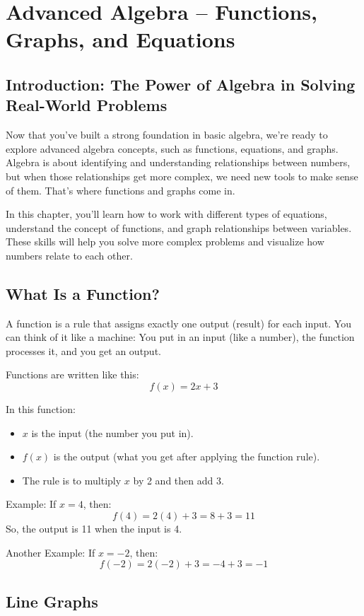 
\chapter{Advanced Algebra – Functions, Graphs, and Equations}

\section{Introduction: The Power of Algebra in Solving Real-World Problems}
Now that you’ve built a strong foundation in basic algebra, we’re ready to explore advanced algebra concepts, such as functions, equations, and graphs. Algebra is about identifying and understanding relationships between numbers, but when those relationships get more complex, we need new tools to make sense of them. That’s where functions and graphs come in.

In this chapter, you’ll learn how to work with different types of equations, understand the concept of functions, and graph relationships between variables. These skills will help you solve more complex problems and visualize how numbers relate to each other.

\section{What Is a Function?}
A function is a rule that assigns exactly one output (result) for each input. You can think of it like a machine: You put in an input (like a number), the function processes it, and you get an output.

Functions are written like this:
\[ f(x) = 2x + 3 \]

In this function:
\begin{itemize}
    \item \( x \) is the input (the number you put in).
    \item \( f(x) \) is the output (what you get after applying the function rule).
    \item The rule is to multiply \( x \) by 2 and then add 3.
\end{itemize}

Example: If \( x = 4 \), then:
\[ f(4) = 2(4) + 3 = 8 + 3 = 11 \]
So, the output is 11 when the input is 4.

Another Example: If \( x = -2 \), then:
\[ f(-2) = 2(-2) + 3 = -4 + 3 = -1 \]

\section{Line Graphs}

